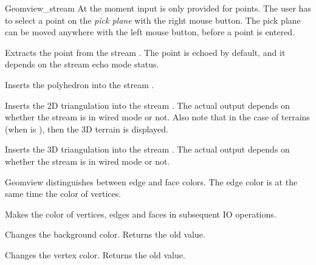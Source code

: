 \begin{ccRefClass}{Geomview_stream}
At the moment input is only provided for points. The user has to select
a point on the {\it pick plane} with the right mouse button. The pick plane
can be moved anywhere with the left mouse button, before a point is entered.

{Extracts the point  from the stream \ccVar. The point is
 echoed by default, and it depends on the stream echo mode status.}





{Inserts the polyhedron  into the stream \ccVar.}


{Inserts the 2D triangulation  into the stream \ccVar.
 The actual output depends on whether the stream is in wired mode or not.
 Also note that in the case of terrains (when  is
 ), then the 3D terrain is displayed.}


{Inserts the 3D triangulation  into the stream \ccVar.
 The actual output depends on whether the stream is in wired mode or not.}


Geomview distinguishes between edge and face colors. The edge color
is at the same time the color of vertices. 

{Makes  the color of vertices, edges and faces in subsequent IO 
 operations.}

{Changes the background color. Returns the old value.}

{Changes the vertex color. Returns the old value.}


\end{ccRefClass}
